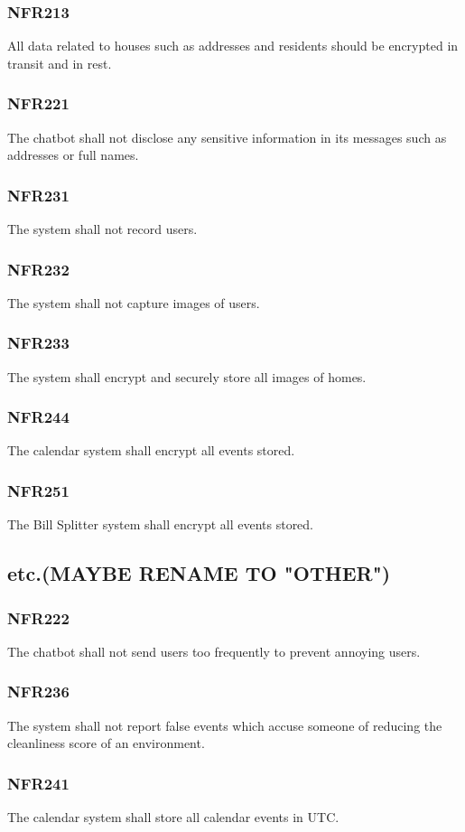 \documentclass[12pt, titlepage]{article}
\begin{document}
\subsubsection{NFR213}
All data related to houses such as addresses and residents should
be encrypted in transit and in rest.
\subsubsection{NFR221}
The chatbot shall not disclose any sensitive information in its
messages such as addresses or full names.
\subsubsection{NFR231}
The system shall not record users.
\subsubsection{NFR232}
The system shall not capture images of users.
\subsubsection{NFR233}
The system shall encrypt and securely store all images of homes.
\subsubsection{NFR244}
The calendar system shall encrypt all events stored.
\subsubsection{NFR251}
The Bill Splitter system shall encrypt all events stored.


\subsection{etc.(MAYBE RENAME TO "OTHER")}
\subsubsection{NFR222}
The chatbot shall not send users too frequently to prevent
annoying users.
\subsubsection{NFR236}
The system shall not report false events which accuse someone of
reducing the cleanliness score of an environment.
\subsubsection{NFR241}
The calendar system shall store all calendar events in UTC.
\end{document}
